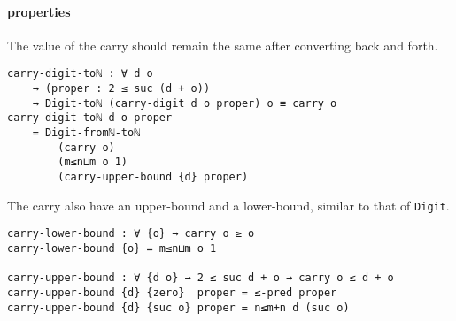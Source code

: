 \documentclass[\main/thesis.tex]{subfiles}
\begin{document}
\paragraph{properties}

The value of the carry should remain the same after converting back and forth.

\begin{lstlisting}
carry-digit-toℕ : ∀ d o
    → (proper : 2 ≤ suc (d + o))
    → Digit-toℕ (carry-digit d o proper) o ≡ carry o
carry-digit-toℕ d o proper
    = Digit-fromℕ-toℕ
        (carry o)
        (m≤n⊔m o 1)
        (carry-upper-bound {d} proper)
\end{lstlisting}

The carry also have an upper-bound and a lower-bound, similar to that of {\lstinline|Digit|}.

\begin{lstlisting}
carry-lower-bound : ∀ {o} → carry o ≥ o
carry-lower-bound {o} = m≤n⊔m o 1

carry-upper-bound : ∀ {d o} → 2 ≤ suc d + o → carry o ≤ d + o
carry-upper-bound {d} {zero}  proper = ≤-pred proper
carry-upper-bound {d} {suc o} proper = n≤m+n d (suc o)
\end{lstlisting}
\end{document}
